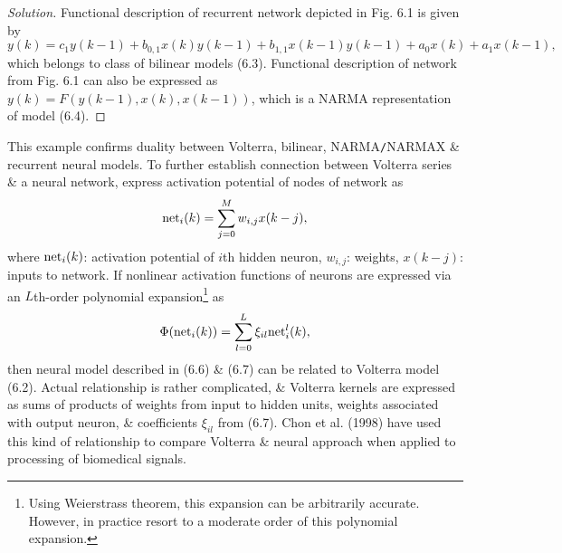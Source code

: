 \documentclass{article}
\begin{document}
\begin{enumerate}
\begin{itemize}
\begin{itemize}
			\begin{proof}[Solution]
				Functional description of recurrent network depicted in Fig. 6.1 is given by
				\begin{equation}
					y(k) = c_1y(k - 1) + b_{0,1}x(k)y(k - 1) + b_{1,1}x(k - 1)y(k - 1) + a_0x(k) + a_1x(k - 1),
				\end{equation}
				which belongs to class of bilinear models (6.3). Functional description of network from Fig. 6.1 can also be expressed as $y(k) = F(y(k - 1),x(k),x(k - 1))$, which is a NARMA representation of model (6.4).
			\end{proof}
			This example confirms duality between Volterra, bilinear, NARMA{\tt/}NARMAX \& recurrent neural models. To further establish connection between Volterra series \& a neural network, express activation potential of nodes of network as
			\begin{equation}
				{\rm net}_i(k) = \sum_{j=0}^M w_{i,j}x(k - j),
			\end{equation}
			where ${\rm net}_i(k)$: activation potential of $i$th hidden neuron, $w_{i,j}$: weights, $x(k - j)$: inputs to network. If nonlinear activation functions of neurons are expressed via an $L$th-order polynomial expansion\footnote{Using Weierstrass theorem, this expansion can be arbitrarily accurate. However, in practice resort to a moderate order of this polynomial expansion.} as
			\begin{equation}
				\Phi({\rm net}_i(k)) = \sum_{l=0}^L \xi_{il}{\rm net}_i^l(k),
			\end{equation}
			then neural model described in (6.6) \& (6.7) can be related to Volterra model (6.2). Actual relationship is rather complicated, \& Volterra kernels are expressed as sums of products of weights from input to hidden units, weights associated with output neuron, \& coefficients $\xi_{il}$ from (6.7). Chon et al. (1998) have used this kind of relationship to compare Volterra \& neural approach when applied to processing of biomedical signals.
			

\end{itemize}
\end{itemize}
\end{enumerate}
\end{document}
